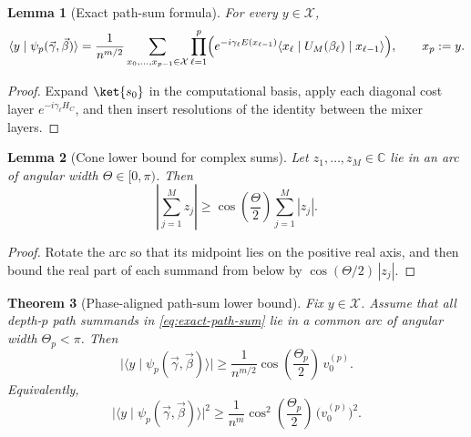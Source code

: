 \documentclass[a4paper,onecolumn,11pt,unpublished]{quantumarticle}
\newtheorem{theorem}{Theorem}
\newtheorem{lemma}[theorem]{Lemma}
\theoremstyle{remark}
\begin{document}
\begin{lemma}[Exact path-sum formula]
\label{lem:exact-path-sum}
For every \(y\in \mathcal X\),
\begin{equation}
\label{eq:exact-path-sum}
\langle y\mid\psi_p(\vec\gamma,\vec\beta)\rangle
=
\frac{1}{n^{m/2}}
\sum_{x_0,\dots,x_{p-1}\in \mathcal X}
\prod_{\ell=1}^{p}
\Bigl(
e^{-i\gamma_\ell E(x_{\ell-1})}
\langle x_\ell\mid U_M(\beta_\ell)\mid x_{\ell-1}\rangle
\Bigr),
\qquad x_p:=y.
\end{equation}
\end{lemma}

\begin{proof}
Expand \(\ket{s_0}\) in the computational basis, apply each diagonal cost layer
\(e^{-i\gamma_\ell H_C}\), and then insert resolutions of the identity between
the mixer layers.
\end{proof}

\begin{lemma}[Cone lower bound for complex sums]
\label{lem:cone-lower-bound-shell}
Let \(z_1,\dots,z_M\in\mathbb C\) lie in an arc of angular width
\(\Theta\in[0,\pi)\). Then
\[
\left|\sum_{j=1}^{M}z_j\right|
\ge
\cos\!\left(\frac{\Theta}{2}\right)\sum_{j=1}^{M}|z_j|.
\]
\end{lemma}

\begin{proof}
Rotate the arc so that its midpoint lies on the positive real axis, and then
bound the real part of each summand from below by
\(\cos(\Theta/2)\,|z_j|\).
\end{proof}

\begin{theorem}[Phase-aligned path-sum lower bound]
\label{thm:phase-aligned-path-sum-lower-bound}
Fix \(y\in \mathcal X\). Assume that all depth-\(p\) path summands in
\eqref{eq:exact-path-sum} lie in a common arc of angular width
\(\Theta_p<\pi\). Then
\begin{equation}
\label{eq:phase-aligned-pointwise}
\bigl|\langle y\mid\psi_p(\vec\gamma,\vec\beta)\rangle\bigr|
\ge
\frac{1}{n^{m/2}}
\cos\!\left(\frac{\Theta_p}{2}\right)\,v_0^{(p)}.
\end{equation}
Equivalently,
\begin{equation}
\label{eq:phase-aligned-pointwise-prob}
\bigl|\langle y\mid\psi_p(\vec\gamma,\vec\beta)\rangle\bigr|^2
\ge
\frac{1}{n^{m}}
\cos^2\!\left(\frac{\Theta_p}{2}\right)\,\bigl(v_0^{(p)}\bigr)^2.
\end{equation}
\end{theorem}
\end{document}
